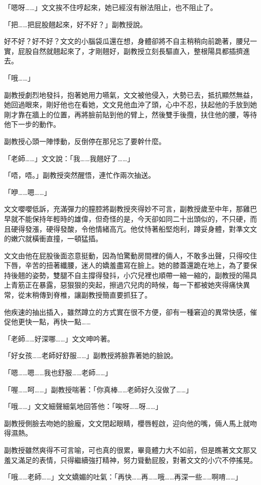 「嗯呀……」文文挨不住哼起來，她已經沒有辦法阻止，也不阻止了。

「把……把屁股翹起來，好不好？」副教授說。

好不好？好不好？文文的小腦袋瓜還在想，身體卻將不自主稍稍向前跪著，腰兒一實，屁股自然就翹起來了，才剛翹好，副教授立刻長驅直入，整根陽具都插擠進去。

「哦……」

副教授劇烈地發抖，抱著她用力嚥氣，文文被他侵入，大勢已去，抵抗顯然無益，她回過眼來，剛好他也在看她，文文見他血沖了頭，心中不忍，扶起他的手放到她剛才靠在牆上的位置，再將臉前貼到他的臂上，然後雙手後攬，扶住他的腰，等待他下一步的動作。

副教授心頭一陣悸動，反倒停在那兒忘了要幹什麼。

「老師……」文文說：「我……我翹好了……」

「唔，唔。」副教授突然醒悟，連忙作兩次抽送。

「咿……嗯……」

文文嚶嚶低訴，充滿彈力的膣腔將副教授夾得妙不可言，副教授歲至中年，那雞巴早就不能保持年輕時的雄偉，但奇怪的是，今天卻如同二十出頭似的，不只硬，而且硬得發漲，硬得發酸，令他情緒高亢。他仗恃著船堅炮利，蹲妥身體，對準文文的嫩穴就橫衝直撞，一頓猛插。

文文由他在屁股後面恣意挺動，因為怕驚動房間裡的倆人，不敢多出聲，只得咬住下唇，辛苦的扭著纖腰，迷人的嬌羞盡寫在臉上。她的膝蓋還跪在地上，為了要保持後翹的姿勢，雙腿不自主撐得發抖，小穴兒裡也順帶一縮一縮的，副教授的陽具上青筋正在暴露，惡狠狠的突起，擦過穴兒肉的時候，每一下都被她夾得痛快異常，從末稍傳到脊椎，讓副教授簡直要抓狂了。

他疾速的抽出插入，雖然蹲立的方式實在很不方便，卻有一種窘迫的異常快感，催促他更快一點，再快一點……

「老師……好深哪……」文文呻吟著。

「好女孩……老師好舒服……」副教授將臉靠著她的臉說。

「嗯……嗯……我也舒服……老師……」

「喔……呵……」副教授喘著：「你真棒……老師好久沒做了……」

「哦……」文文細聲細氣地回答他：「唉呀……呀……」

副教授側臉去吻她的臉龐，文文閉起眼睛，櫻唇輕啟，迎向他的嘴，倆人馬上就吻得濕熱。

副教授雖然爽得不可言喻，可也真的很累，畢竟體力大不如前，但是瞧著文文那又羞又滿足的表情，只得繼續強打精神，努力聳動屁股，對著文文的小穴不停搖晃。

「哦……老師……」文文嬌媚的吐氣：「再快……再……哦……再深一些……啊唷……」

